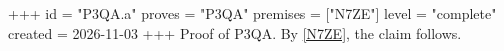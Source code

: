 +++
id = "P3QA.a"
proves = "P3QA"
premises = ["N7ZE"]
level = "complete"
created = 2026-11-03
+++
Proof of P3QA. By \ref{N7ZE}, the claim follows.
